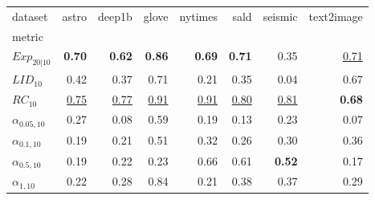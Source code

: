 \begin{tabular}{lrrrrrrr}
dataset & astro & deep1b & glove & nytimes & sald & seismic & text2image \\
metric &  &  &  &  &  &  &  \\
$Exp_{20|10}$ & \textbf{0.70} & \textbf{0.62} & \textbf{0.86} & \textbf{0.69} & \textbf{0.71} & 0.35 & \underline{0.71} \\
$LID_{10}$ & 0.42 & 0.37 & 0.71 & 0.21 & 0.35 & 0.04 & 0.67 \\
$RC_{10}$ & \underline{0.75} & \underline{0.77} & \underline{0.91} & \underline{0.91} & \underline{0.80} & \underline{0.81} & \textbf{0.68} \\
$\alpha_{0.05, 10}$ & 0.27 & 0.08 & 0.59 & 0.19 & 0.13 & 0.23 & 0.07 \\
$\alpha_{0.1, 10}$ & 0.19 & 0.21 & 0.51 & 0.32 & 0.26 & 0.30 & 0.36 \\
$\alpha_{0.5, 10}$ & 0.19 & 0.22 & 0.23 & 0.66 & 0.61 & \textbf{0.52} & 0.17 \\
$\alpha_{1, 10}$ & 0.22 & 0.28 & 0.84 & 0.21 & 0.38 & 0.37 & 0.29 \\
\end{tabular}
